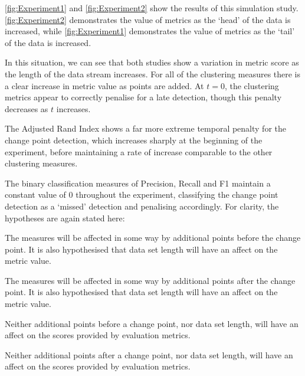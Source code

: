\documentclass[../main.tex]{subfiles}
\begin{document}
\autoref{fig:Experiment1} and \autoref{fig:Experiment2} show the results of this simulation study. \autoref{fig:Experiment2} demonstrates the value of metrics as the `head' of the data is increased, while \autoref{fig:Experiment1} demonstrates the value of metrics as the `tail' of the data is increased.

In this situation, we can see that both studies show a variation in metric score as the length of the data stream increases. For all of the clustering measures there is a clear increase in metric value as points are added. At $t=0$, the clustering metrics appear to correctly penalise for a late detection, though this penalty decreases as $t$ increases.

The Adjusted Rand Index shows a far more extreme temporal penalty for the change point detection, which increases sharply at the beginning of the experiment, before maintaining a rate of increase comparable to the other clustering measures.

The binary classification measures of Precision, Recall and F1 maintain a constant value of $0$ throughout the experiment, classifying the change point detection as a `missed' detection and penalising accordingly. For clarity, the hypotheses are again stated here:

\begin{hypothesis*}
    The measures will be affected in some way by additional points before the change point. It is also hypothesised that data set length will have an affect on the metric value.
\end{hypothesis*}

\begin{hypothesis*}
    The measures will be affected in some way by additional points after the change point. It is also hypothesised that data set length will have an affect on the metric value.
\end{hypothesis*}

\begin{nullhypothesis*}
    Neither additional points before a change point, nor data set length, will have an affect on the scores provided by evaluation metrics.
\end{nullhypothesis*}

\begin{nullhypothesis*}
    Neither additional points after a change point, nor data set length, will have an affect on the scores provided by evaluation metrics.
\end{nullhypothesis*}
\end{document}
